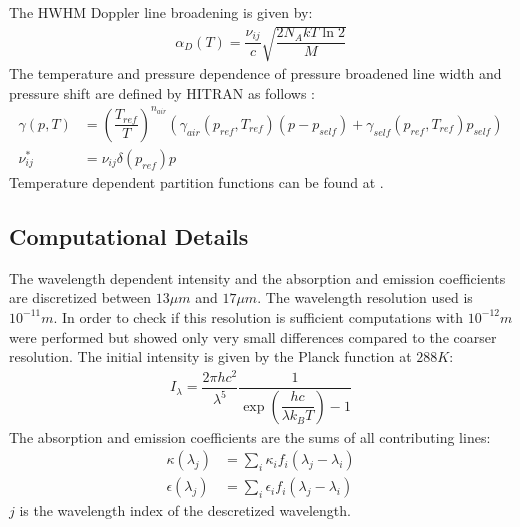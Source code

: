 The HWHM Doppler line broadening is given by: 
\begin{align*}
	\alpha_D(T) = \dfrac{\nu_{ij}}{c} \sqrt{\dfrac{2 N_A k T \ln 2}{M}}
\end{align*}
The temperature and pressure dependence of pressure broadened line width and pressure shift are defined by HITRAN as follows \cite{hitran2}: 
\begin{align*}
	\gamma(p, T) &= \left(\dfrac{T_{ref}}{T}\right)^{n_{air}}  
	               \left(  \gamma_{air} (p_{ref}, T_{ref}) (p - p_{self}) +
	                       \gamma_{self}(p_{ref}, T_{ref}) p_{self}  \right) 		 \\
	\nu_{ij}^*   &= \nu_{ij} \delta(p_{ref}) p
\end{align*}
Temperature dependent partition functions can be found at \cite{hitran3}.

\subsection{Computational Details}

The wavelength dependent intensity and the absorption and emission coefficients are discretized between $13 \mu m$ and $17 \mu m$. The wavelength resolution used is $10^{-11} m$. In order to check if this resolution is sufficient computations with $10^{-12} m$ were performed but showed only very small differences compared to the coarser resolution.      
\newline
\newline
The initial intensity is given by the Planck function at $288 K$:
\begin{align}
	I_\lambda = \dfrac{2 \pi h c^2}{\lambda^5} \dfrac{1}{\exp\left(\dfrac{h c}{\lambda k_B T}\right) - 1}
\end{align}
The absorption and emission coefficients are the sums of all contributing lines: 
\begin{align*}
	\kappa(\lambda_j) &= \sum_i \kappa_i f_i(\lambda_j - \lambda_i) \\
	\epsilon(\lambda_j) &= \sum_i \epsilon_i f_i(\lambda_j - \lambda_i)
\end{align*}
$j$ is the wavelength index of the descretized wavelength. 


